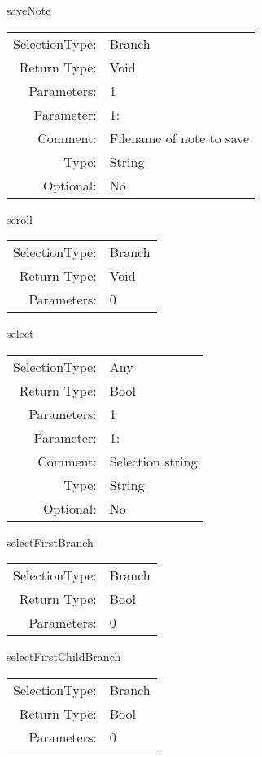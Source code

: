 \item saveNote\\
\begin{tabular}{rl}
  SelectionType: & Branch\\
    Return Type: & Void\\
     Parameters: & 1\\
   Parameter: &  1:\\
        Comment: & Filename of note to save\\
           Type: & String\\
       Optional: &  No\\
\end{tabular}

\item scroll\\
\begin{tabular}{rl}
  SelectionType: & Branch\\
    Return Type: & Void\\
     Parameters: & 0\\
\end{tabular}

\item select\\
\begin{tabular}{rl}
  SelectionType: & Any\\
    Return Type: & Bool\\
     Parameters: & 1\\
   Parameter: &  1:\\
        Comment: & Selection string\\
           Type: & String\\
       Optional: &  No\\
\end{tabular}

\item selectFirstBranch\\
\begin{tabular}{rl}
  SelectionType: & Branch\\
    Return Type: & Bool\\
     Parameters: & 0\\
\end{tabular}

\item selectFirstChildBranch\\
\begin{tabular}{rl}
  SelectionType: & Branch\\
    Return Type: & Bool\\
     Parameters: & 0\\
\end{tabular}

